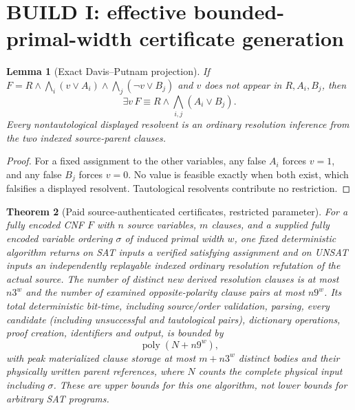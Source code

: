 \documentclass[11pt]{article}
\newtheorem{theorem}{Theorem}
\newtheorem{lemma}[theorem]{Lemma}
\begin{document}
\section{BUILD I: effective bounded-primal-width certificate generation}
\begin{lemma}[Exact Davis--Putnam projection]
If $F=R\wedge\bigwedge_i(v\vee A_i)\wedge\bigwedge_j(\neg v\vee B_j)$ and $v$ does not appear in $R,A_i,B_j$, then
\[
\exists v\,F\equiv R\wedge\bigwedge_{i,j}(A_i\vee B_j).
\]
Every nontautological displayed resolvent is an ordinary resolution inference from the two indexed source-parent clauses.
\end{lemma}
\begin{proof}
For a fixed assignment to the other variables, any false $A_i$ forces $v=1$, and any false $B_j$ forces $v=0$. No value is feasible exactly when both exist, which falsifies a displayed resolvent. Tautological resolvents contribute no restriction.
\end{proof}
\begin{theorem}[Paid source-authenticated certificates, restricted parameter]
For a fully encoded CNF $F$ with $n$ source variables, $m$ clauses, and a supplied fully encoded variable ordering $\sigma$ of induced \emph{primal} width $w$, one fixed deterministic algorithm returns on SAT inputs a verified satisfying assignment and on UNSAT inputs an independently replayable indexed ordinary resolution refutation of the actual source. The number of distinct new derived resolution clauses is at most $n3^w$ and the number of examined opposite-polarity clause pairs at most $n9^w$. Its total deterministic bit-time, including source/order validation, parsing, every candidate (including unsuccessful and tautological pairs), dictionary operations, proof creation, identifiers and output, is bounded by
\[
\operatorname{poly}(N+n9^w),
\]
with peak materialized clause storage at most $m+n3^w$ distinct bodies and their physically written parent references, where $N$ counts the complete physical input including $\sigma$. These are \emph{upper bounds} for this one algorithm, not lower bounds for arbitrary SAT programs.
\end{theorem}
\end{document}
